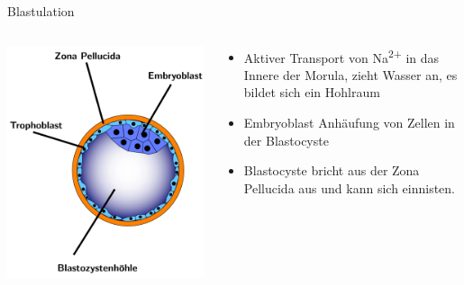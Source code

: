 \documentclass{beamer}
\begin{document}
\begin{frame}{Blastulation}

\begin{columns}[c]


\begin{column}{5cm}
\begin{center}
    \includegraphics[width=\textwidth]{Blastozyste.png}


\end{center}

\end{column}

\begin{column}{5cm}

\begin{itemize}

\item 
Aktiver Transport von Na\textsuperscript{2+} in das Innere der Morula, zieht Wasser an, es bildet sich ein Hohlraum 
\item
Embryoblast Anhäufung von Zellen in der Blastocyste
    \item
    Blastocyste bricht aus der Zona Pellucida aus und kann sich einnisten. 
 
\end{itemize}

\end{column}

\end{columns}

\end{frame}
\end{document}
